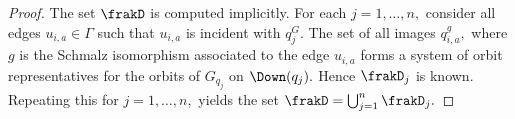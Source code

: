 \begin{proof}
\smallskip

The set $\frakD$ is computed implicitly. 
For each $j = 1,\ldots,n,$ consider all edges $u_{i,a} \in \Gamma$ such that 
$u_{i,a}$ is incident with $q_j^G.$ 
The set of all images $q_{i,a}^g,$ where $g$ 
is the Schmalz isomorphism associated to the edge $u_{i,a}$ 
forms a system of orbit representatives 
for the orbits of $G_{q_j}$ on $\Down(q_j).$ 
Hence $\frakD_j$ is known.
Repeating this for $j=1,\ldots,n,$ yields the set $\frakD = \bigcup_{j=1}^n \frakD_j.$
\eop
\end{proof}







